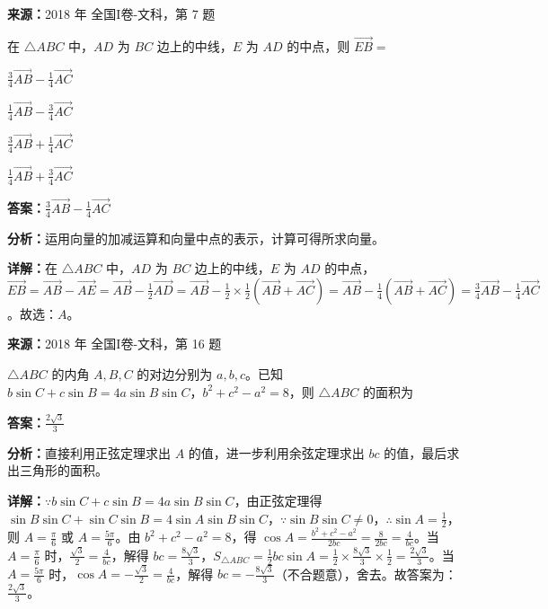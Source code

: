 \begin{question}[points=5]
\textbf{来源：}2018 年 全国I卷-文科，第 7 题\par
在 $\triangle ABC$ 中，$AD$ 为 $BC$ 边上的中线，$E$ 为 $AD$ 的中点，则 $\overrightarrow{EB}=$
\begin{choices}
  \item $\frac{3}{4}\overrightarrow{AB}-\frac{1}{4}\overrightarrow{AC}$
  \item $\frac{1}{4}\overrightarrow{AB}-\frac{3}{4}\overrightarrow{AC}$
  \item $\frac{3}{4}\overrightarrow{AB}+\frac{1}{4}\overrightarrow{AC}$
  \item $\frac{1}{4}\overrightarrow{AB}+\frac{3}{4}\overrightarrow{AC}$
\end{choices}
\begin{solution}
\textbf{答案：}$\frac{3}{4}\overrightarrow{AB}-\frac{1}{4}\overrightarrow{AC}$

\textbf{分析：}运用向量的加减运算和向量中点的表示，计算可得所求向量。

\textbf{详解：}在 $\triangle ABC$ 中，$AD$ 为 $BC$ 边上的中线，$E$ 为 $AD$ 的中点，$\overrightarrow{EB}=\overrightarrow{AB}-\overrightarrow{AE}=\overrightarrow{AB}-\frac{1}{2}\overrightarrow{AD}=\overrightarrow{AB}-\frac{1}{2}\times\frac{1}{2}(\overrightarrow{AB}+\overrightarrow{AC})=\overrightarrow{AB}-\frac{1}{4}(\overrightarrow{AB}+\overrightarrow{AC})=\frac{3}{4}\overrightarrow{AB}-\frac{1}{4}\overrightarrow{AC}$。故选：$A$。
\end{solution}
\end{question}

\begin{question}[points=5]
\textbf{来源：}2018 年 全国I卷-文科，第 16 题\par
$\triangle ABC$ 的内角 $A,B,C$ 的对边分别为 $a,b,c$。已知 $b\sin C+c\sin B=4a\sin B\sin C$，$b^2+c^2-a^2=8$，则 $\triangle ABC$ 的面积为
\begin{solution}
\textbf{答案：}$\frac{2\sqrt{3}}{3}$

\textbf{分析：}直接利用正弦定理求出 $A$ 的值，进一步利用余弦定理求出 $bc$ 的值，最后求出三角形的面积。

\textbf{详解：}$\because b\sin C+c\sin B=4a\sin B\sin C$，由正弦定理得 $\sin B\sin C+\sin C\sin B=4\sin A\sin B\sin C$，$\because \sin B\sin C\neq0$，$\therefore \sin A=\frac{1}{2}$，则 $A=\frac{\pi}{6}$ 或 $A=\frac{5\pi}{6}$。由 $b^2+c^2-a^2=8$，得 $\cos A=\frac{b^2+c^2-a^2}{2bc}=\frac{8}{2bc}=\frac{4}{bc}$。当 $A=\frac{\pi}{6}$ 时，$\frac{\sqrt{3}}{2}=\frac{4}{bc}$，解得 $bc=\frac{8\sqrt{3}}{3}$，$S_{\triangle ABC}=\frac{1}{2}bc\sin A=\frac{1}{2}\times\frac{8\sqrt{3}}{3}\times\frac{1}{2}=\frac{2\sqrt{3}}{3}$。当 $A=\frac{5\pi}{6}$ 时，$\cos A=-\frac{\sqrt{3}}{2}=\frac{4}{bc}$，解得 $bc=-\frac{8\sqrt{3}}{3}$（不合题意），舍去。故答案为：$\frac{2\sqrt{3}}{3}$。
\end{solution}
\end{question}

